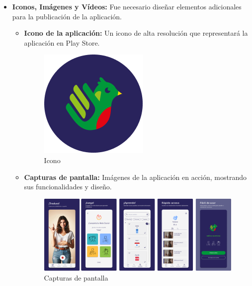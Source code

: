 \begin{itemize}
\begin{itemize}
        
    \end{itemize}
    \item \textbf{Iconos, Imágenes y Vídeos:}
    Fue necesario diseñar elementos adicionales para la publicación de la aplicación. 
    
    \begin{itemize}
        \item \textbf{Icono de la aplicación:} Un icono de alta resolución que representará la aplicación en Play Store.

        
        \begin{figure} [H]
            \centering
            \includegraphics[width=0.25\linewidth]{figuras/icono.png}
            \caption{Icono}
            \label{fig:enter-label}
        \end{figure}

        
        \item \textbf{Capturas de pantalla:} Imágenes de la aplicación en acción, mostrando sus funcionalidades y diseño.


        \begin{figure} [H]
            \centering
            \includegraphics[width=1\linewidth]{figuras/capturas_app.png}
            \caption{Capturas de pantalla}
            \label{fig:enter-label}
        \end{figure}


\end{itemize}
\end{itemize}
